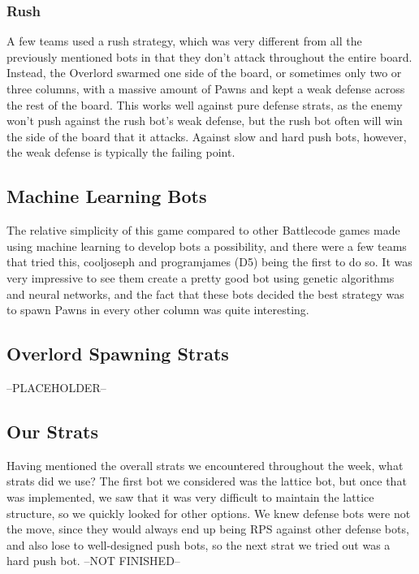 \documentclass{article}
\begin{document}
\subsubsection{Rush}
\hspace{\parindent}
A few teams used a rush strategy, which was very different from all the previously mentioned bots in that they don’t attack throughout the entire board. Instead, the Overlord swarmed one side of the board, or sometimes only two or three columns, with a massive amount of Pawns and kept a weak defense across the rest of the board. This works well against pure defense strats, as the enemy won’t push against the rush bot’s weak defense, but the rush bot often will win the side of the board that it attacks. Against slow and hard push bots, however, the weak defense is typically the failing point. 

\subsection{Machine Learning Bots}
\hspace{\parindent}
The relative simplicity of this game compared to other Battlecode games made using machine learning to develop bots a possibility, and there were a few teams that tried this, cooljoseph and programjames (D5) being the first to do so. It was very impressive to see them create a pretty good bot using genetic algorithms and neural networks, and the fact that these bots decided the best strategy was to spawn Pawns in every other column was quite interesting.

\subsection{Overlord Spawning Strats}
\hspace{\parindent}
--PLACEHOLDER--

\subsection{Our Strats}
\hspace{\parindent}
Having mentioned the overall strats we encountered throughout the week, what strats did we use? The first bot we considered was the lattice bot, but once that was implemented, we saw that it was very difficult to maintain the lattice structure, so we quickly looked for other options. We knew defense bots were not the move, since they would always end up being RPS against other defense bots, and also lose to well-designed push bots, so the next strat we tried out was a hard push bot. --NOT FINISHED--
\end{document}
